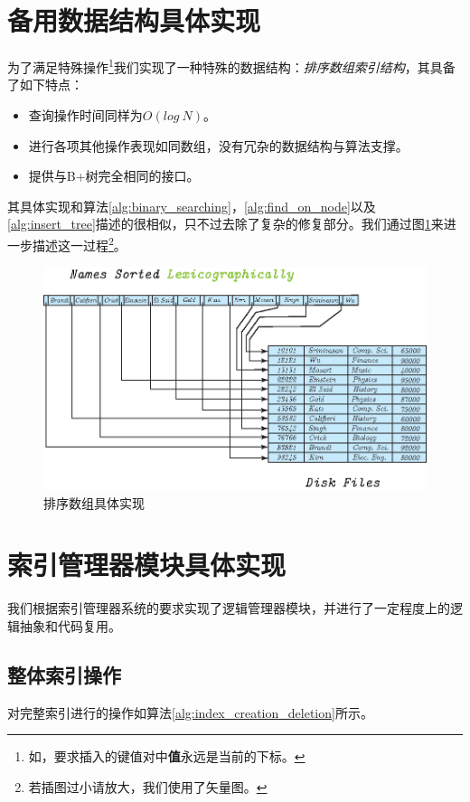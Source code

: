 \documentclass[UTF8]{ctexrep} %
\begin{document}
\section{备用数据结构具体实现}
为了满足特殊操作\footnote{如，要求插入的键值对中\textbf{值}永远是当前的下标。}我们实现了一种特殊的数据结构：\textit{排序数组索引结构}，其具备了如下特点：
\begin{itemize}
    \item 查询操作时间同样为$O(log\ N)$。
    \item 进行各项其他操作表现如同数组，没有冗杂的数据结构与算法支撑。
    \item 提供与B+树完全相同的接口。
\end{itemize}
其具体实现和算法\ref{alg:binary_searching}，\ref{alg:find_on_node}以及\ref{alg:insert_tree}描述的很相似，只不过去除了复杂的修复部分。我们通过图\ref{fig:sorted_list}来进一步描述这一过程\footnote{若插图过小请放大，我们使用了矢量图。}。

\begin{figure}[H]
    \centering
    \includegraphics[width=0.8\linewidth]{figure/sorted_list.eps}
    \caption{排序数组具体实现}
    \label{fig:sorted_list}
\end{figure}


\section{索引管理器模块具体实现}
我们根据索引管理器系统的要求实现了逻辑管理器模块，并进行了一定程度上的逻辑抽象和代码复用。

\subsection{整体索引操作}
对完整索引进行的操作如算法\ref{alg:index_creation_deletion}所示。


\algnewcommand{}
\algnewcommand\Raise{\algorithmicraise}
\end{document}
